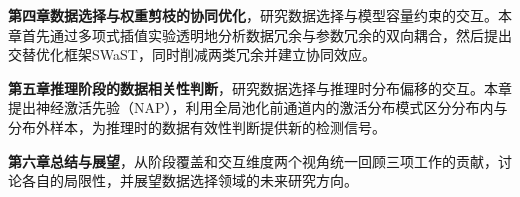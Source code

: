 \textbf{第四章\quad 数据选择与权重剪枝的协同优化}，研究数据选择与模型容量约束的交互。本章首先通过多项式插值实验透明地分析数据冗余与参数冗余的双向耦合，然后提出交替优化框架SWaST，同时削减两类冗余并建立协同效应。

\textbf{第五章\quad 推理阶段的数据相关性判断}，研究数据选择与推理时分布偏移的交互。本章提出神经激活先验（NAP），利用全局池化前通道内的激活分布模式区分分布内与分布外样本，为推理时的数据有效性判断提供新的检测信号。

\textbf{第六章\quad 总结与展望}，从阶段覆盖和交互维度两个视角统一回顾三项工作的贡献，讨论各自的局限性，并展望数据选择领域的未来研究方向。
